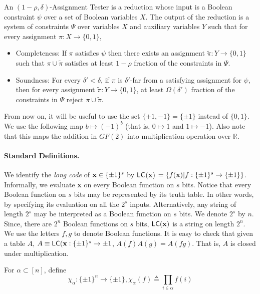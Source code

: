 \begin{definition} \label{AT} An $(1 - \rho,
  \delta)$-Assignment Tester is a reduction whose input is a Boolean
  constraint $\psi$ over a set of Boolean variables $X$. The output of
  the reduction is a system of constraints $\Psi$ over variables $X$
  and auxiliary variables $Y$ such that for every assignment $\pi: X
  \rightarrow \{0,1\}$,
\begin{itemize}
\item {\sf Completeness:} If $\pi$ satisfies $\psi$ then there exists
  an assignment $\tilde{\pi} : Y \rightarrow \{0,1\}$ such that $\pi
  \cup \tilde{\pi}$ satisfies at least $1 - \rho$ fraction of
  the constraints in $\Psi$.
\item {\sf Soundness:} For every $\delta' < \delta$, if $\pi$ is
  $\delta'$-far from a satisfying assignment for $\psi$, then for
  every assignment $\tilde{\pi}: Y \rightarrow \{0,1\}$, at least
  $\Omega(\delta')$ fraction of the constraints in $\Psi$ reject $\pi \cup
  \tilde{\pi}$.
\end{itemize}
\end{definition}

From now on, it will be useful to use the set $\{+1 , -1\} = \{\pm
1\}$ instead of $\{0,1\}$. We use the following map $b \mapsto (-1)^b$
(that is, $0 \mapsto 1$ and $1 \mapsto -1$). Also note that this maps
the addition in $GF(2)$ into multiplication operation over
$\mathbb{R}$.


\paragraph{Standard Definitions.} We identify the {\em long code} of
${\bf x} \in \{\pm 1\}^s$ by ${\sf LC}$({\bf x}) $= \{ f({\bf x}) | f :
\{\pm 1\}^s \rightarrow \{\pm 1\} \}$. Informally, we evaluate {\bf x}
on every Boolean function on $s$ bits. Notice that every Boolean
function on $s$ bits may be represented by its truth table. In other
words, by specifying its evaluation on all the $2^s$
inputs. Alternatively, any string of length $2^s$ may be interpreted
as a Boolean function on $s$ bits. We denote $2^s$ by $n$. Since,
there are $2^{n}$ Boolean functions on $s$ bits, ${\sf LC}({\bf x})$ is a
string on length $2^{n}$. We use the letters $f, g$ to denote Boolean
functions. It is easy to check that given a table $A$, $ A \equiv
{\sf LC}({\bf x} : \{ \pm 1\}^s \rightarrow {\pm 1}$, $A(f) A(g) =
A(fg)$. That is, $A$ is closed under multiplication.

For $\alpha \subset [n]$, define
\[
          \chi_\alpha : \{\pm 1\}^n \rightarrow \{\pm 1\},  \chi_\alpha(f) \triangleq \prod_{i\in \alpha}f(i)
\]

